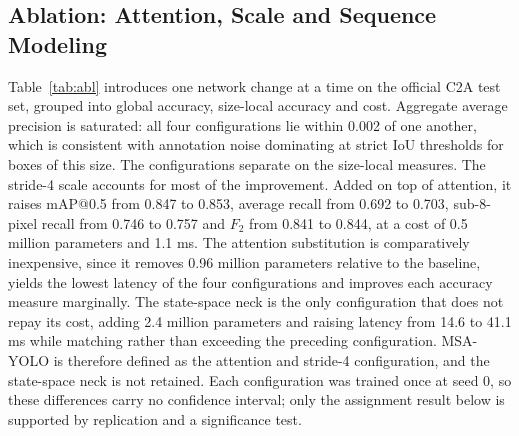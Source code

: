 \documentclass[conference,a4paper]{IEEEtran}
\begin{document}
\label{sec:where}

\subsection{Ablation: Attention, Scale and Sequence Modeling}
Table~\ref{tab:abl} introduces one network change at a time on the official C2A
test set, grouped into global accuracy, size-local accuracy and cost.
Aggregate average precision is saturated: all four configurations lie within
0.002 of one another, which is consistent with annotation noise dominating at
strict IoU thresholds for boxes of this size. The configurations separate on the
size-local measures. The stride-4 scale accounts for most of the improvement.
Added on top of attention, it raises mAP@0.5 from 0.847 to 0.853, average recall
from 0.692 to 0.703, sub-8-pixel recall from 0.746 to 0.757 and $F_2$ from 0.841
to 0.844, at a cost of 0.5 million parameters and 1.1 ms. The attention
substitution is comparatively inexpensive, since it removes 0.96 million
parameters relative to the baseline, yields the lowest latency of the four
configurations and improves each accuracy measure marginally. The state-space
neck is the only configuration that does not repay its cost, adding 2.4 million
parameters and raising latency from 14.6 to 41.1 ms while matching rather than
exceeding the preceding configuration. MSA-YOLO is therefore defined as the
attention and stride-4 configuration, and the state-space neck is not retained.
Each configuration was trained once at seed 0, so these differences carry no
confidence interval; only the assignment result below is supported by
replication and a significance test.
\end{document}
